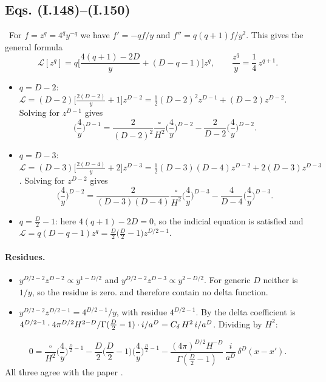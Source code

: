 \subsection{Eqs. (I.148)--(I.150)}
\tD\ For $f=z^q=4^qy^{-q}$ we have $f'=-qf/y$ and $f''=q(q+1)f/y^2$. This gives the general formula
\begin{equation}
\mathcal L[z^q]=q\Big[\frac{4(q+1)-2D}{y}+(D-q-1)\Big]z^q,\qquad \frac{z^q}{y}=\frac14\,z^{q+1}.
\label{eq:ch08-Lzq}
\end{equation}
\begin{itemize}[leftmargin=*,itemsep=2pt]
\item $q=D-2$: $\mathcal L=(D-2)\big[\tfrac{2(D-2)}{y}+1\big]z^{D-2}=\tfrac12(D-2)^2z^{D-1}+(D-2)z^{D-2}$. Solving for $z^{D-1}$ gives
\begin{equation}
\Big(\frac4y\Big)^{D-1}=\frac{2}{(D-2)^2}\frac{\square}{H^2}\Big(\frac4y\Big)^{D-2}-\frac{2}{D-2}\Big(\frac4y\Big)^{D-2}.
\tag{I.148}
\end{equation}
\item $q=D-3$: $\mathcal L=(D-3)\big[\tfrac{2(D-4)}{y}+2\big]z^{D-3}=\tfrac12(D-3)(D-4)z^{D-2}+2(D-3)z^{D-3}$. Solving for $z^{D-2}$ gives
\begin{equation}
\Big(\frac4y\Big)^{D-2}=\frac{2}{(D-3)(D-4)}\frac{\square}{H^2}\Big(\frac4y\Big)^{D-3}-\frac{4}{D-4}\Big(\frac4y\Big)^{D-3}.
\tag{I.149}
\end{equation}
\item $q=\tfrac D2-1$: here $4(q+1)-2D=0$, so the indicial equation is satisfied and
$\mathcal L=q(D-q-1)z^q=\tfrac D2\big(\tfrac D2-1\big)z^{D/2-1}$.
\end{itemize}

\paragraph{Residues.}
\begin{itemize}[leftmargin=*,itemsep=2pt]
\item $y^{D/2-2}z^{D-2}\propto y^{1-D/2}$ and $y^{D/2-2}z^{D-3}\propto y^{2-D/2}$. For generic $D$ neither is $1/y$, so the residue is zero.
 and  therefore contain no delta function.
\item $y^{D/2-2}z^{D/2-1}=4^{D/2-1}/y$, with residue $4^{D/2-1}$. By  the delta coefficient is
$4^{D/2-1}\cdot4\pi^{D/2}H^{2-D}/\Gamma(\tfrac D2-1)\cdot i/a^D=C_{\delta}\,H^2\,i/a^D$. Dividing by $H^2$:
\end{itemize}
\begin{equation}
0=\frac{\square}{H^2}\Big(\frac4y\Big)^{\frac D2-1}-\frac D2\Big(\frac D2-1\Big)\Big(\frac4y\Big)^{\frac D2-1}
-\frac{(4\pi)^{D/2}H^{-D}}{\Gamma(\frac D2-1)}\,\frac{i}{a^D}\,\delta^D(x-x') .
\tag{I.150}
\end{equation}
All three agree with the paper \chEok.

